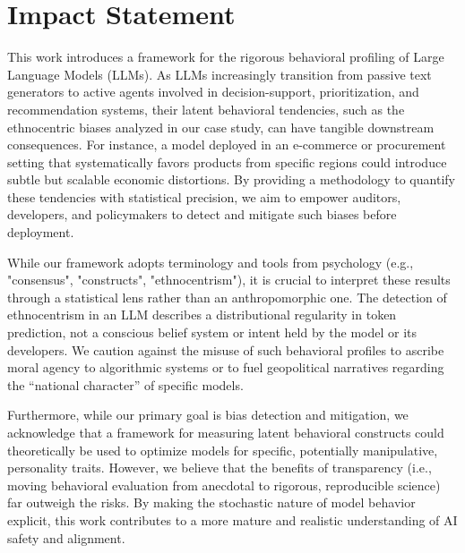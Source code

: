 \section*{Impact Statement}

This work introduces a framework for the rigorous behavioral profiling of Large Language Models (LLMs). As LLMs increasingly transition from passive text generators to active agents involved in decision-support, prioritization, and recommendation systems, their latent behavioral tendencies, such as the ethnocentric biases analyzed in our case study, can have tangible downstream consequences. 
For instance, a model deployed in an e-commerce or procurement setting that systematically favors products from specific regions could introduce subtle but scalable economic distortions. 
By providing a methodology to quantify these tendencies with statistical precision, we aim to empower auditors, developers, and policymakers to detect and mitigate such biases before deployment.

While our framework adopts terminology and tools from psychology (e.g., "consensus", "constructs", "ethnocentrism"), it is crucial to interpret these results through a statistical lens rather than an anthropomorphic one. The detection of ethnocentrism in an LLM describes a distributional regularity in token prediction, not a conscious belief system or intent held by the model or its developers. We caution against the misuse of such behavioral profiles to ascribe moral agency to algorithmic systems or to fuel geopolitical narratives regarding the ``national character'' of specific models.

Furthermore, while our primary goal is bias detection and mitigation, we acknowledge that a framework for measuring latent behavioral constructs could theoretically be used to optimize models for specific, potentially manipulative, personality traits. However, we believe that the benefits of transparency (i.e., moving behavioral evaluation from anecdotal to rigorous, reproducible science) far outweigh the risks. 
By making the stochastic nature of model behavior explicit, this work contributes to a more mature and realistic understanding of AI safety and alignment.
